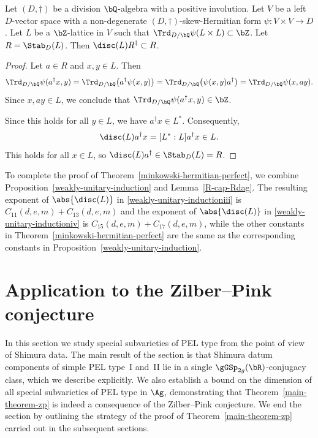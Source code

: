 \begin{lemma} \label{R-cap-Rdag}
Let $(D,\dag)$ be a division $\bQ$-algebra with a positive involution.
Let $V$ be a left $D$-vector space with a non-degenerate $(D,\dag)$-skew-Hermitian form $\psi \colon V \times V \to D$.
Let $L$ be a $\bZ$-lattice in $V$ such that $\Trd_{D/\bQ} \psi(L \times L) \subset \bZ$.
Let $R = \Stab_D(L)$.
Then $\disc(L) R^\dag \subset R$.
\end{lemma}

\begin{proof}
Let $a \in R$ and $x, y \in L$.
Then
\[
\Trd_{D/\bQ} \psi(a^\dag x, y)
= \Trd_{D/\bQ} \bigl( a^\dag \psi(x,y) \bigr)
= \Trd_{D/\bQ} \bigl( \psi(x,y) a^\dag \bigr)
= \Trd_{D/\bQ} \psi(x,ay).
\]
Since $x, ay \in L$, we conclude that $\Trd_{D/\bQ} \psi(a^\dag x, y) \in \bZ$.

Since this holds for all $y \in L$, we have $a^\dag x \in L^*$.
Consequently,
\[
\disc(L)a^\dag x = [L^*:L]a^\dag x \in L.
\]
This holds for all $x \in L$, so $\disc(L)a^\dag \in \Stab_D(L) = R$.
\end{proof}

To complete the proof of Theorem~\ref{minkowski-hermitian-perfect}, we combine Proposition~\ref{weakly-unitary-induction} and Lemma~\ref{R-cap-Rdag}. The resulting expo\-nent of $\abs{\disc(L)}$ in \eqref{weakly-unitary-inductioniii} is $C_{11}(d,e,m)+C_{13}(d,e,m)$ and the exponent of $\abs{\disc(L)}$ in \eqref{weakly-unitary-inductioniv} is $C_{15}(d,e,m)+C_{17}(d,e,m)$, while the other constants in Theorem~\ref{minkowski-hermitian-perfect} are the same as the corresponding constants in Proposition~\ref{weakly-unitary-induction}.

\section{Application to the Zilber--Pink conjecture} \label{sec:ZP-high-level}

In this section we study special subvarieties of PEL type from the point of view of Shimura data.
The main result of the section is that Shimura datum components of simple PEL type~I and~II lie in a single $\gGSp_{2g}(\bR)$-conjugacy class, which we describe explicitly. We also establish a bound on the dimension of all special subvarieties of PEL type in $\Ag$, demonstrating that Theorem~\ref{main-theorem-zp} is indeed a consequence of the Zilber--Pink conjecture. We end the section by outlining the strategy of the proof of Theorem~\ref{main-theorem-zp} carried out in the subsequent sections.

